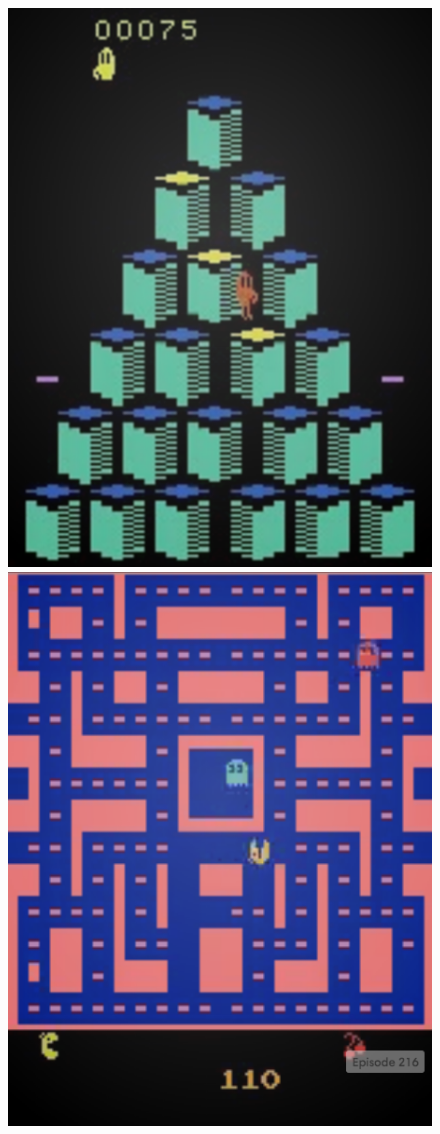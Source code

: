 \documentclass[final]{beamer}
\newlength{\onecolwid}
\begin{document}
\begin{frame}[t]
\begin{columns}[t]
\begin{column}{\onecolwid}

\begin{figure}[h]
    \begin{minipage}{0.8\textwidth}
        \centering
        \includegraphics[scale=0.5]{Qbert}
        \centering
        \includegraphics[scale=0.5]{MsPacman}

\end{minipage}
\end{figure}
\end{column}
\end{columns}
\end{frame}
\end{document}
